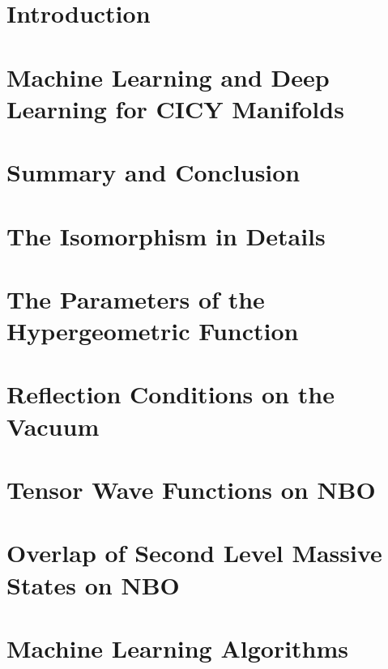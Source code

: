 \documentclass[a4paper,11pt,twoside]{thesis}
\begin{document}
\label{part:deeplearning}
\section{Introduction}

\section{Machine Learning and Deep Learning for CICY Manifolds}

\section{Summary and Conclusion}
\label{sec:conclusion}



\label{part:appendix}
\appendix
\section{The Isomorphism in Details}
\label{sec:isomorphism}


\section{The Parameters of the Hypergeometric Function}
\label{sec:parameters}


\section{Reflection Conditions on the Vacuum}
\label{sec:details_reflection}


\section{Tensor Wave Functions on NBO}
\label{sec:NO_tensor_wave}


\section{Overlap of Second Level Massive States on NBO}
\label{sec:NO_full_TTS}


\section{Machine Learning Algorithms}
\label{app:ml-algo}



\cleardoubleplainpage{}
\printbibliography[heading=bibintoc]
\end{document}
